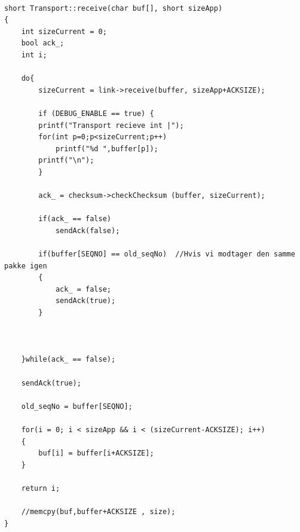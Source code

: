 \begin{lstlisting}[frame=single]  % Start your code-block

short Transport::receive(char buf[], short sizeApp)
{
    int sizeCurrent = 0;
    bool ack_;
    int i;

    do{
        sizeCurrent = link->receive(buffer, sizeApp+ACKSIZE);

        if (DEBUG_ENABLE == true) {
        printf("Transport recieve int |");
        for(int p=0;p<sizeCurrent;p++)
            printf("%d ",buffer[p]);
        printf("\n");
        }

        ack_ = checksum->checkChecksum (buffer, sizeCurrent);

        if(ack_ == false)
            sendAck(false);

        if(buffer[SEQNO] == old_seqNo)  //Hvis vi modtager den samme pakke igen
        {
            ack_ = false;   
            sendAck(true); 
        }



    }while(ack_ == false);

    sendAck(true);

    old_seqNo = buffer[SEQNO];

    for(i = 0; i < sizeApp && i < (sizeCurrent-ACKSIZE); i++)
    {
        buf[i] = buffer[i+ACKSIZE];
    }

    return i;

    //memcpy(buf,buffer+ACKSIZE , size);
}

\end{lstlisting}


